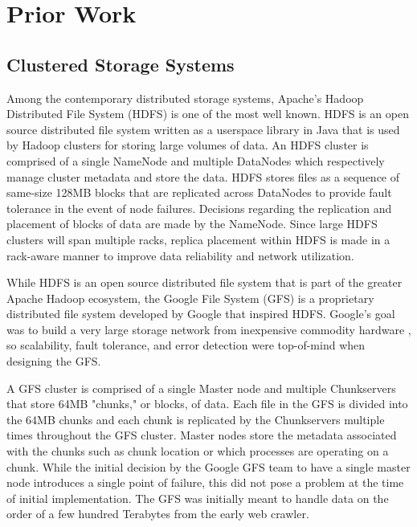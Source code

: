 \documentclass[12pt]{article}
\begin{document}
\section{Prior Work}

  \subsection{Clustered Storage Systems}

  Among the contemporary distributed storage systems, Apache's Hadoop
  Distributed File System (HDFS) \cite{hadoop} \cite{hdfs2008} is one of the
  most well known. HDFS is an open source distributed file system written as a
  userspace library in Java that is used by Hadoop clusters for storing large
  volumes of data. An HDFS cluster is comprised of a single NameNode and
  multiple DataNodes which respectively manage cluster metadata and store the
  data. HDFS stores files as a sequence of same-size 128MB blocks that are
  replicated across DataNodes to provide fault tolerance in the event of node
  failures. Decisions regarding the replication and placement of blocks of data
  are made by the NameNode.  Since large HDFS clusters will span multiple
  racks, replica placement within HDFS is made in a rack-aware manner to
  improve data reliability and network utilization.

  While HDFS is an open source distributed file system that is part of the
  greater Apache Hadoop ecosystem, the Google File System (GFS) \cite{gfs} is a
  proprietary distributed file system developed by Google that inspired HDFS.
  Google's goal was to build a very large storage network from inexpensive
  commodity hardware \cite{gfs-interview}, so scalability, fault tolerance, and
  error detection were top-of-mind when designing the GFS.

  A GFS cluster is comprised of a single Master node and multiple Chunkservers
  that store 64MB "chunks," or blocks, of data. Each file in the GFS is divided
  into the 64MB chunks and each chunk is replicated by the Chunkservers
  multiple times throughout the GFS cluster. Master nodes store the metadata
  associated with the chunks such as chunk location or which processes are
  operating on a chunk. While the initial decision by the Google GFS team to
  have a single master node introduces a single point of failure, this did not
  pose a problem at the time of initial implementation. The GFS was initially
  meant to handle data on the order of a few hundred Terabytes from the early
  web crawler.
\end{document}
